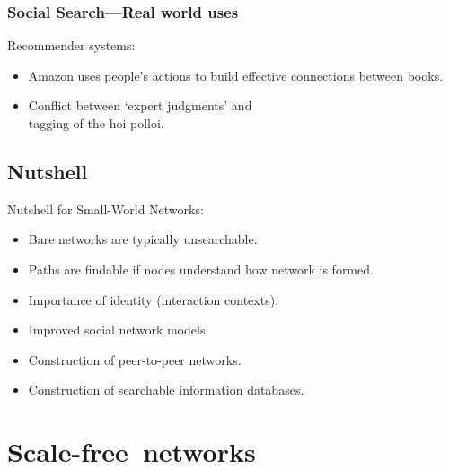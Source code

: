 \begin{frame}
  \frametitle{Social Search---Real world uses}

  \begin{block}{Recommender systems:}
    \begin{itemize}
    \item<1->
      Amazon uses people's actions to build
      effective connections between books.  
    \item<2->
      Conflict between `expert judgments' and\\
      tagging of the hoi polloi.
    \end{itemize}
  \end{block}



\end{frame}

\subsection{Nutshell}

\begin{frame}

  \begin{block}{Nutshell for Small-World Networks:}
    \begin{itemize}
    \item<+->
      Bare networks are typically unsearchable.
    \item<+-> 
      Paths are findable if nodes understand how network is formed.
    \item<+-> 
      Importance of identity (interaction contexts).
    \item<+-> 
      Improved social network models.
    \item<+-> 
      Construction of peer-to-peer networks.
    \item<+-> 
      Construction of searchable information databases.
    \end{itemize}
  \end{block}

\end{frame}


\section{Scale-free\ networks}

